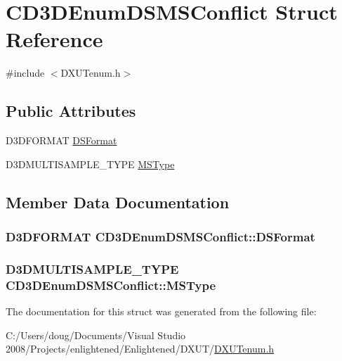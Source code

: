 \hypertarget{struct_c_d3_d_enum_d_s_m_s_conflict}{
\section{CD3DEnumDSMSConflict Struct Reference}
\label{struct_c_d3_d_enum_d_s_m_s_conflict}
}


{\ttfamily \#include $<$DXUTenum.h$>$}\subsection*{Public Attributes}
\begin{DoxyCompactItemize}
\item 
D3DFORMAT \hyperlink{struct_c_d3_d_enum_d_s_m_s_conflict_ae5b18b8215b4388567712ed4f9e72642}{DSFormat}
\item 
D3DMULTISAMPLE\_\-TYPE \hyperlink{struct_c_d3_d_enum_d_s_m_s_conflict_aae4ad1d4d97d1d577381ea1522354ba4}{MSType}
\end{DoxyCompactItemize}


\subsection{Member Data Documentation}
\hypertarget{struct_c_d3_d_enum_d_s_m_s_conflict_ae5b18b8215b4388567712ed4f9e72642}{
\subsubsection[{DSFormat}]{\setlength{\rightskip}{0pt plus 5cm}D3DFORMAT {\bf CD3DEnumDSMSConflict::DSFormat}}}
\label{struct_c_d3_d_enum_d_s_m_s_conflict_ae5b18b8215b4388567712ed4f9e72642}
\hypertarget{struct_c_d3_d_enum_d_s_m_s_conflict_aae4ad1d4d97d1d577381ea1522354ba4}{
\subsubsection[{MSType}]{\setlength{\rightskip}{0pt plus 5cm}D3DMULTISAMPLE\_\-TYPE {\bf CD3DEnumDSMSConflict::MSType}}}
\label{struct_c_d3_d_enum_d_s_m_s_conflict_aae4ad1d4d97d1d577381ea1522354ba4}


The documentation for this struct was generated from the following file:\begin{DoxyCompactItemize}
\item 
C:/Users/doug/Documents/Visual Studio 2008/Projects/enlightened/Enlightened/DXUT/\hyperlink{_d_x_u_tenum_8h}{DXUTenum.h}\end{DoxyCompactItemize}
